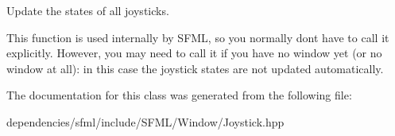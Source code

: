 Update the states of all joysticks. 

This function is used internally by S\+F\+ML, so you normally don\textquotesingle{}t have to call it explicitly. However, you may need to call it if you have no window yet (or no window at all)\+: in this case the joystick states are not updated automatically. 

The documentation for this class was generated from the following file\+:\begin{DoxyCompactItemize}
\item 
dependencies/sfml/include/\+S\+F\+M\+L/\+Window/Joystick.\+hpp\end{DoxyCompactItemize}
